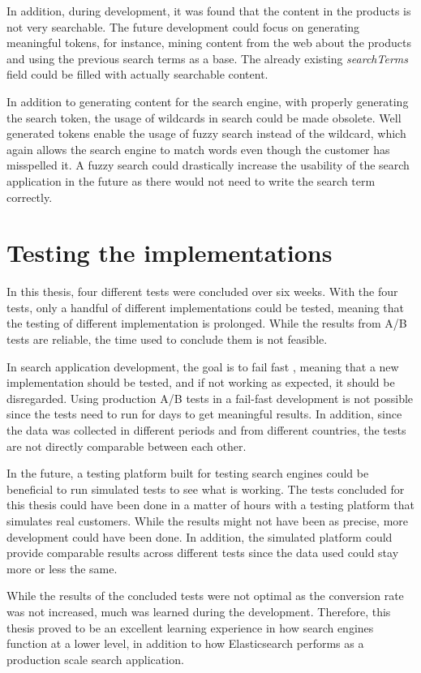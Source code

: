 In addition, during development, it was found that the content in the products is not very searchable.
The future development could focus on generating meaningful tokens,
for instance, mining content from the web about the products and using the previous search terms as a base.
The already existing \emph{searchTerms} field could be filled with actually searchable content.

In addition to generating content for the search engine, with properly generating the search token,
the usage of wildcards in search could be made obsolete.
Well generated tokens enable the usage of fuzzy search instead of the wildcard, which again allows
the search engine to match words even though the customer has misspelled it.
A fuzzy search could drastically increase the usability of the search application in the future as there would not 
need to write the search term correctly.


\section{Testing the implementations}

In this thesis, four different tests were concluded over six weeks.
With the four tests, only a handful of different implementations could be tested, meaning that the testing
of different implementation is prolonged.
While the results from A/B tests are reliable, the time used to conclude them is not feasible.


In search application development, the goal
is to fail fast  \cite{relevantSearch}, meaning that a new implementation should be tested, and if not working as expected,
it should be disregarded. 
Using production A/B tests in a fail-fast development is not possible since the tests need to run for days
to get meaningful results.
In addition, since the data was collected in different periods and from different countries, the tests
are not directly comparable between each other.


In the future, a testing platform built for testing search engines could be beneficial 
to run simulated tests to see what is working.
The tests concluded for this thesis could have been done in a matter of hours with a testing platform
that simulates real customers.
While the results might not have been as precise, more development could have been done.
In addition, the simulated platform could provide comparable results across different tests since the data used
could stay more or less the same.



While the results of the concluded tests were not optimal as the conversion rate was not increased,
much was learned during the development.
Therefore, this thesis proved to be an excellent learning experience in how search engines function at a lower level, 
in addition to how Elasticsearch performs as a production scale search application.


